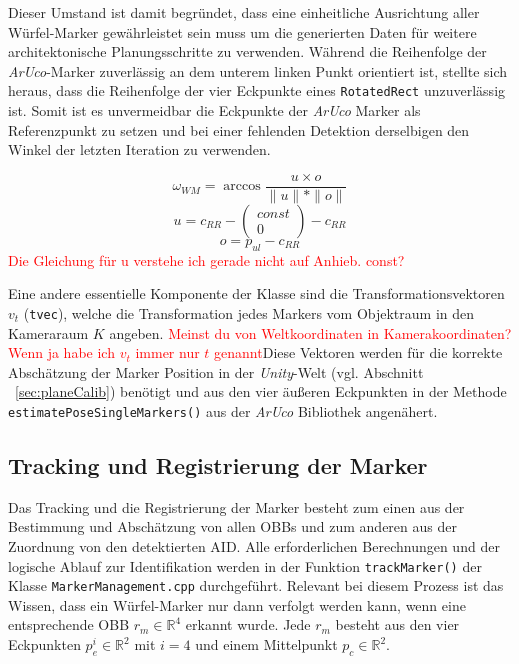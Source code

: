  Dieser Umstand ist damit begründet, dass eine einheitliche Ausrichtung aller Würfel-Marker gewährleistet sein muss um die generierten Daten für weitere architektonische Planungsschritte zu verwenden. Während die Reihenfolge der \textit{ArUco}-Marker zuverlässig an dem unterem linken Punkt orientiert ist, stellte sich heraus, dass die Reihenfolge der vier Eckpunkte eines \texttt{Rotated\-Rect} unzuverlässig ist. Somit ist es unvermeidbar die Eckpunkte der \textit{ ArUco} Marker als Referenzpunkt zu setzen und bei einer fehlenden Detektion derselbigen den Winkel der letzten Iteration zu verwenden. 

\begin{equation}
\label{equ:OmegaWinkel}
\omega_{WM} = \arccos \frac{u \times o}{\|u\|*\|o\|} 
\end{equation}
\begin{equation}
u = c_{RR} - \begin{pmatrix}
const\\ 0
\end{pmatrix}  -c_{RR}
\end{equation}
\begin{equation}
o=p_{ul}-c_{RR}
\end{equation}
\textcolor{red}{Die Gleichung für u verstehe ich gerade nicht auf Anhieb. const?}


Eine andere essentielle Komponente der Klasse sind die Transformationsvektoren $v_t$ (\texttt{tvec}), welche die Transformation jedes Markers vom Objektraum in den Kameraraum $K$ angeben. \textcolor{red}{Meinst du von Weltkoordinaten in Kamerakoordinaten? Wenn ja habe ich $v_t$ immer nur $t$ genannt}Diese Vektoren werden für die korrekte Abschätzung der Marker Position in der \textit{Unity}-Welt (vgl. Abschnitt ~\ref{sec:planeCalib}) benötigt und aus den vier äußeren Eckpunkten in der Methode \texttt{estimate\-Pose\-Single\-Markers()} aus der \textit{ArUco} Bibliothek angenähert. 

\subsection{Tracking und Registrierung der Marker}\label{sec:trackAndReg}
Das Tracking und die Registrierung der Marker besteht zum einen aus der Bestimmung und Abschätzung von allen OBBs und zum anderen aus der Zuordnung von den detektierten AID. Alle erforderlichen Berechnungen und der logische Ablauf zur Identifikation werden in der Funktion \texttt{track\-Marker()} der Klasse \texttt{Marker\-Management.cpp} durchgeführt. Relevant bei diesem Prozess ist das Wissen, dass ein Würfel-Marker nur dann verfolgt werden kann, wenn eine entsprechende OBB $r_m \in \mathbb{R}^4$ erkannt wurde. Jede $r_m$ besteht aus den vier Eckpunkten $p_e^i \in \mathbb{R}^2$ mit $i=4$ und einem Mittelpunkt $p_c \in \mathbb{R}^2$.


